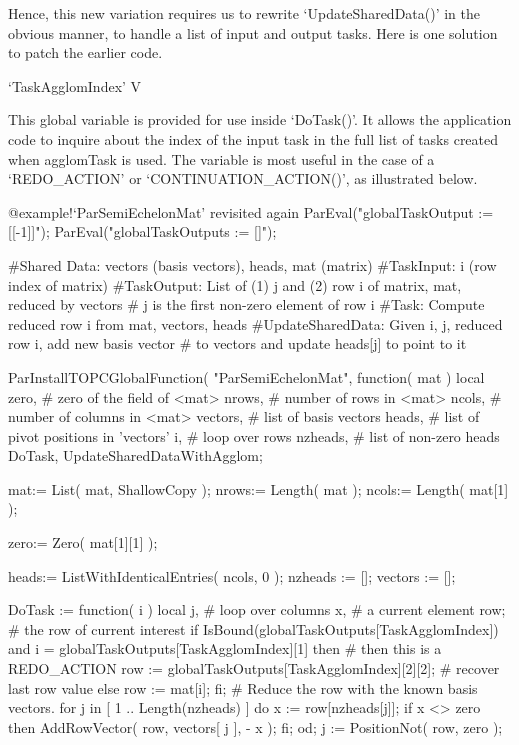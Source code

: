 Hence, this new variation requires us to rewrite
`UpdateSharedData()' in the obvious manner, to handle a list of input
and output tasks.  Here is one solution to patch the earlier code.

\>`TaskAgglomIndex' V

This global variable is provided for use inside `DoTask()'.  It allows
the application code to inquire about the index of the input task in
the full list of tasks created when agglomTask is used.  The variable
is most useful in the case of a `REDO_ACTION' or
`CONTINUATION_ACTION()', as illustrated below.

%
{@example!\noexpand`ParSemiEchelonMat' revisited again}
\beginexample
ParEval("globalTaskOutput := [[-1]]");
ParEval("globalTaskOutputs := []");

#Shared Data: vectors (basis vectors), heads, mat (matrix)
#TaskInput:   i (row index of matrix)
#TaskOutput:  List of (1) j and (2) row i of matrix, mat, reduced by vectors
#               j is the first non-zero element of row i
#Task:        Compute reduced row i from mat, vectors, heads
#UpdateSharedData:  Given i, j, reduced row i, add new basis vector
#               to vectors and update heads[j] to point to it

ParInstallTOPCGlobalFunction( "ParSemiEchelonMat", function( mat )
  local zero,      # zero of the field of <mat>
        nrows,     # number of rows in <mat>
        ncols,     # number of columns in <mat>
        vectors,   # list of basis vectors
        heads,     # list of pivot positions in 'vectors'
        i,         # loop over rows
        nzheads,   # list of non-zero heads
        DoTask, UpdateSharedDataWithAgglom;

  mat:= List( mat, ShallowCopy );
  nrows:= Length( mat );
  ncols:= Length( mat[1] );

  zero:= Zero( mat[1][1] );

  heads:= ListWithIdenticalEntries( ncols, 0 );
  nzheads := [];
  vectors := [];

  DoTask := function( i )
      local j,         # loop over columns
            x,         # a current element
            row;       # the row of current interest
    if IsBound(globalTaskOutputs[TaskAgglomIndex])
        and i = globalTaskOutputs[TaskAgglomIndex][1] then
      # then this is a REDO_ACTION
      row := globalTaskOutputs[TaskAgglomIndex][2][2]; # recover last row value
    else row := mat[i];
    fi;
    # Reduce the row with the known basis vectors.
    for j in [ 1 .. Length(nzheads) ] do
      x := row[nzheads[j]];
      if x <> zero then
        AddRowVector( row, vectors[ j ], - x );
      fi;
    od;
    j := PositionNot( row, zero );

